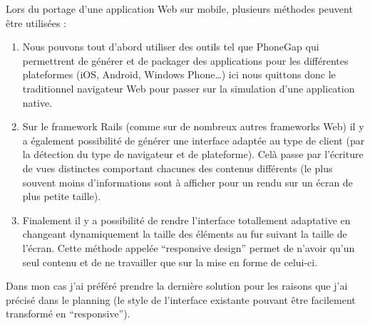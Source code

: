 \documentclass[12pt,a4paper]{book}
\begin{document}
Lors du portage d'une application Web sur mobile, plusieurs méthodes peuvent être utilisées :
\begin{enumerate}
  \item Nous pouvons tout d'abord utiliser des outils tel que PhoneGap qui permettrent de générer et de packager des applications pour les différentes plateformes (iOS, Android, Windows Phone…) ici nous quittons donc le traditionnel navigateur Web pour passer sur la simulation d'une application native.
  \item Sur le framework Rails (comme sur de nombreux autres frameworks Web) il y a également possibilité de générer une interface adaptée au type de client (par la détection du type de navigateur et de plateforme). Celà passe par l'écriture de vues distinctes comportant chacunes des contenus différents (le plus souvent moins d'informations sont à afficher pour un rendu sur un écran de plus petite taille).
  \item Finalement il y a possibilité de rendre l'interface totallement adaptative en changeant dynamiquement la taille des éléments au fur suivant la taille de l'écran. Cette méthode appelée ``responsive design'' permet de n'avoir qu'un seul contenu et de ne travailler que sur la mise en forme de celui-ci.
\end{enumerate}

Dans mon cas j'ai préféré prendre la dernière solution pour les raisons que j'ai précisé dans le planning (le style de l'interface existante pouvant être facilement transformé en ``responsive'').
\end{document}
